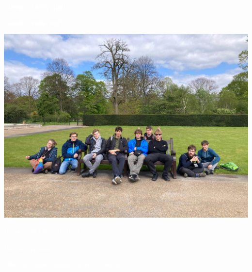 \documentclass[a5paper, twoside]{article}
\newcommand{\boxik}[3]{
  \begin{tcolorbox}[
    sharp corners,
    colback = #1,
    boxrule = 0pt,
    grow to left by = 25pt,
    grow to right by = 25pt,
    right = 22pt,
    left = 22pt%
  ]
    \textcolor{#2}{#3}
  \end{tcolorbox}
}
\begin{document}
\boxik{red}{white}{
\begin{minipage}{\linewidth}
  \begin{minipage}{0.32\linewidth}
    \texttt{[image: tatry.jpg]}
  \end{minipage}
  \hfill
  \begin{minipage}{0.32\linewidth}
    \texttt{[image: voda.png]}
  \end{minipage}
  \hfill
  \begin{minipage}{0.32\linewidth}
    \includegraphics[width=\linewidth]{londyn.jpg}
  \end{minipage}
\end{minipage}
\newline
\noindent
\begin{minipage}{\linewidth}
  \vspace{0.75em}
  \begin{minipage}{0.32\linewidth}
    \centering \textcolor{white}{Krásné výhledy v Tatrách.}
  \end{minipage}
  \hfill
  \begin{minipage}{0.32\linewidth}
    \centering \textcolor{white}{Pohoda na vodě.}
  \end{minipage}
  \hfill
  \begin{minipage}{0.32\linewidth}
    \centering \textcolor{white}{Občas jezdíme i jinam -- naši v Londýně.}
  \end{minipage}
\end{minipage}
}
\end{document}
